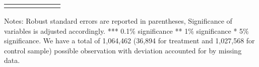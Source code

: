 \begin{sidewaystable}[!htbp]
{\begin{threeparttable}
\begin{tabular}{@{\extracolsep{5pt}}lD{.}{.}{-3} D{.}{.}{-3} D{.}{.}{-3} D{.}{.}{-3} D{.}{.}{-3} D{.}{.}{-3} }
\bottomrule \\[-1.8ex] 

\end{tabular} 

\begin{tablenotes}
  \LARGE
      Notes: Robust standard errors are reported in parentheses, Significance of variables is adjusted accordingly. *** 0.1\% significance ** 1\% significance * 5\% significance. We have a total of 1,064,462 (36,894 for treatment and 1,027,568 for control sample) possible observation with deviation accounted for by missing data.
\end{tablenotes}    



\end{threeparttable}
}
\end{sidewaystable} 